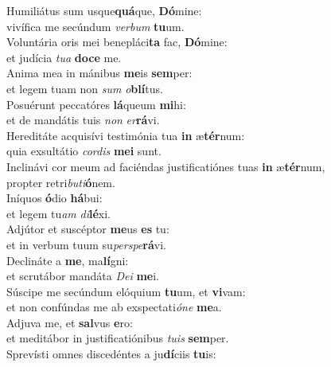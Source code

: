 \oddverse Humiliátus sum usque\textbf{quá}que, \textbf{Dó}mine:~\*\\
\oddverse vivífica me secúndum \textit{ver}\textit{bum} \textbf{tu}um.\\
\evenverse Voluntária oris mei benepláci\textbf{ta} fac, \textbf{Dó}mine:~\*\\
\evenverse et judícia \textit{tu}\textit{a} \textbf{do}\textbf{ce} me.\\
\oddverse Anima mea in mánibus \textbf{me}is \textbf{sem}per:~\*\\
\oddverse et legem tuam non \textit{sum} \textit{o}\textbf{blí}tus.\\
\evenverse Posuérunt peccatóres \textbf{lá}queum \textbf{mi}hi:~\*\\
\evenverse et de mandátis tuis \textit{non} \textit{er}\textbf{rá}vi.\\
\oddverse Hereditáte acquisívi testimónia tua \textbf{in} æ\textbf{tér}num:~\*\\
\oddverse quia exsultátio \textit{cor}\textit{dis} \textbf{me}\textbf{i} sunt.\\
\evenverse Inclinávi cor meum ad faciéndas justificatiónes tuas \textbf{in} æ\textbf{tér}num,~\*\\
\evenverse propter retri\textit{bu}\textit{ti}\textbf{ó}nem.\\
\oddverse Iníquos \textbf{ó}dio \textbf{há}bui:~\*\\
\oddverse et legem tu\textit{am} \textit{di}\textbf{lé}xi.\\
\evenverse Adjútor et suscéptor \textbf{me}us \textbf{es} tu:~\*\\
\evenverse et in verbum tuum su\textit{per}\textit{spe}\textbf{rá}vi.\\
\oddverse Declináte a \textbf{me}, ma\textbf{lí}gni:~\*\\
\oddverse et scrutábor mandáta \textit{De}\textit{i} \textbf{me}i.\\
\evenverse Súscipe me secúndum elóquium \textbf{tu}um, et \textbf{vi}vam:~\*\\
\evenverse et non confúndas me ab exspectati\textit{ó}\textit{ne} \textbf{me}a.\\
\oddverse Adjuva me, et \textbf{sal}vus \textbf{e}ro:~\*\\
\oddverse et meditábor in justificatiónibus \textit{tu}\textit{is} \textbf{sem}per.\\
\evenverse Sprevísti omnes discedéntes a ju\textbf{dí}ciis \textbf{tu}is:~\*\\
